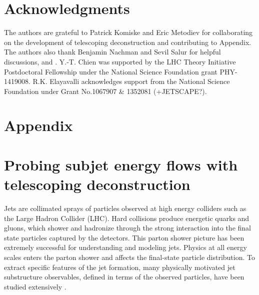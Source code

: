 \documentclass[notoc]{JHEP3}
\begin{document}
\section*{Acknowledgments}
The authors are grateful to Patrick Komiske and Eric Metodiev for collaborating on the development of telescoping deconstruction and contributing to Appendix. The authors also thank Benjamin Nachman and Sevil Salur for helpful discussions, and . Y.-T. Chien was supported by the LHC Theory Initiative Postdoctoral Fellowship under the National Science Foundation grant PHY-1419008. R.K. Elayavalli acknowledges support from the National Science Foundation under Grant No.1067907 \& 1352081 (+JETSCAPE?).

























\newpage
\appendix
\section*{Appendix}
\section{Probing subjet energy flows with telescoping deconstruction}

Jets are collimated sprays of particles observed at high energy colliders such as the Large Hadron Collider (LHC). Hard collisions produce energetic quarks and gluons, which shower and hadronize through the strong interaction into the final state particles captured by the detectors. This parton shower picture has been extremely successful for understanding and modeling jets. Physics at all energy scales enters the parton shower and affects the final-state particle distribution. To extract specific features of the jet formation, many physically motivated jet substructure observables, defined in terms of the observed particles, have been studied extensively \cite{Abdesselam:2010pt,Altheimer:2012mn,Altheimer:2013yza,Adams:2015hiv,Larkoski:2017jix,ATLAS-CONF-2017-064,Khachatryan:1955546}.
\end{document}
